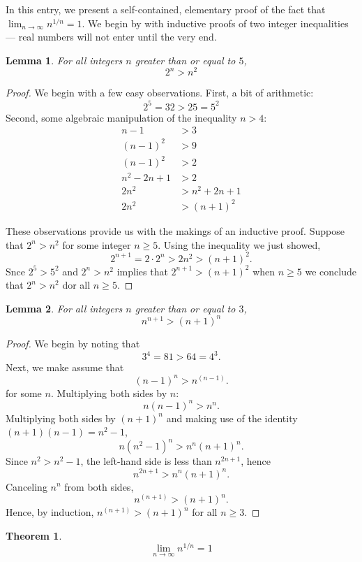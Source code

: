 \documentclass[12pt]{article}
\newtheorem{lemma}{Lemma}
\newtheorem{theorem}{Theorem}
\begin{document}
In this entry, we present a self-contained, elementary
proof of the fact that\, $\lim_{n \to \infty} n^{1/n} = 1$.
We begin by with inductive proofs of two integer 
inequalities --- real numbers will not enter until
the very end.

\begin{lemma}
For all integers $n$ greater than or equal to $5$,
\[
 2^n > n^2
\]
\end{lemma}

\begin{proof}
We begin with a few easy observations.  First,
a bit of arithmetic:
\[
 2^5 = 32 > 25 = 5^2
\]
Second, some algebraic manipulation of the inequality $n > 4$:
\begin{align*}
 n - 1 &> 3 \\
 (n - 1)^2 &> 9 \\
 (n - 1)^2 &> 2 \\
 n^2 - 2n + 1 &> 2 \\
 2n^2 &> n^2 + 2n + 1 \\
 2n^2 &> (n + 1)^2
\end{align*}

These observations provide us with the makings of an
inductive proof.  Suppose that $2^n > n^2$ for some
integer $n \ge 5$.  Using the inequality we just showed,
\[
 2^{n+1} = 2 \cdot 2^n > 2 n^2 > (n+1)^2.
\]
Snce $2^5 > 5^2$ and  $2^n > n^2$ implies that $2^{n+1} > 
(n + 1)^2$ when $n \ge 5$ we conclude that $2^n > n^2$ dor
all $n \ge 5$.
\end{proof}

\begin{lemma}
For all integers $n$ greater than or equal to $3$,
\[
 n^{n+1} > (n+1)^n
\]
\end{lemma}

\begin{proof}
We begin by noting that
\[
 3^4 = 81 > 64 = 4^3.
\]
Next, we make assume that
\[
 (n-1)^n > n^{(n-1)}.
\]
for some $n$.
Multiplying both sides by $n$:
\[
 n (n-1)^n > n^n.
\]
Multiplying both sides by $(n+1)^n$ and making 
use of the identity $(n+1)(n-1) = n^2 - 1$,
\[
 n (n^2 - 1)^n > n^n (n +1)^n.
\]
Since $n^2 > n^2 - 1$, the left-hand side is 
less than $n^{2n+1}$, hence
\[
 n^{2n+1} > n^n (n +1)^n.
\]
Canceling $n^n$ from both sides,
\[
 n^{(n+1)} > (n+1)^n.
\]
Hence, by induction, $n^{(n+1)} > (n+1)^n$
for all $n \ge 3$.
\end{proof}

\begin{theorem}
\[
 \lim_{n \to \infty} n^{1/n} = 1
\]
\end{theorem}
\end{document}
